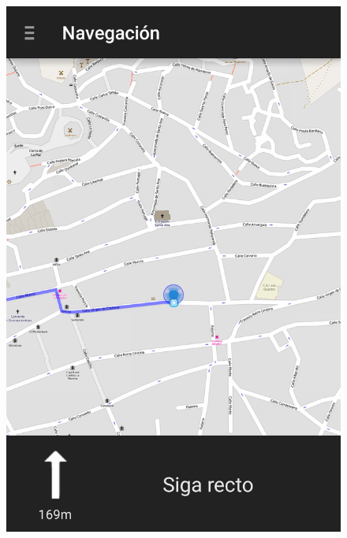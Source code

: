\begin{slide}
\begin{center}
\begin{minipage}[b]{0.3\linewidth}
\begin{center}
\begin{figure}
          \includegraphics[height=0.65\textheight]{img/naviganto-rutaini.png}
        \end{figure}
      \end{center}
    \end{minipage}
  \end{center}
\end{slide}


